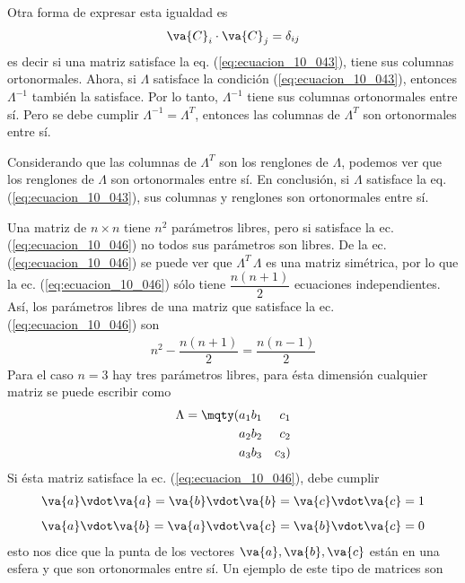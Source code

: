 Otra forma de expresar esta igualdad es
\begin{align}
\va{C}_{i} \cdot \va{C}_{j} = \delta_{ij}
\label{eq:ecuacion_10_047}
\end{align}
es decir si una matriz satisface la eq. (\ref{eq:ecuacion_10_043}), tiene sus columnas ortonormales.
Ahora, si $\Lambda$ satisface la condición (\ref{eq:ecuacion_10_043}), entonces $\Lambda^{-1}$ también la satisface. Por lo tanto, $\Lambda^{-1}$ tiene sus columnas ortonormales entre sí. Pero se debe cumplir $\Lambda^{-1} = \Lambda^{T}$, entonces las columnas de $\Lambda^{T}$ son ortonormales entre sí.
\par
Considerando que las columnas de $\Lambda^{T}$ son los renglones de $\Lambda$, podemos ver que los renglones de $\Lambda$ son ortonormales entre sí. En conclusión, si $\Lambda$ satisface la eq. (\ref{eq:ecuacion_10_043}), sus columnas y renglones son ortonormales entre sí.
\par
Una matriz de $n \times n$ tiene $n^{2}$ parámetros libres, pero si satisface la ec. (\ref{eq:ecuacion_10_046}) no todos sus parámetros son libres. De la ec. (\ref{eq:ecuacion_10_046}) se puede ver que $\Lambda^{T} \, \Lambda$ es una matriz simétrica, por lo que la ec. (\ref{eq:ecuacion_10_046}) sólo tiene $\dfrac{n (n+1)}{2}$ ecuaciones independientes. Así, los parámetros libres de una matriz que satisface la ec. (\ref{eq:ecuacion_10_046}) son
\begin{align*}
n^{2} - \dfrac{n (n+1)}{2} = \dfrac{n (n-1)}{2}
\end{align*}
Para el caso $n = 3$ hay tres parámetros libres, para ésta dimensión cualquier matriz se puede escribir como
\begin{align}
\Lambda = \mqty(a_{1} & b_{1} & c_{1} \\ a_{2} & b_{2} & c_{2} \\ a_{3} & b_{3} & c_{3})
\label{eq:ecuacion_10_048}
\end{align}
Si ésta matriz satisface la ec. (\ref{eq:ecuacion_10_046}), debe cumplir
\begin{align}
\begin{aligned}
\va{a} \vdot \va{a} = \va{b} \vdot \va{b} = \va{c} \vdot \va{c} =  1 \\[0.5em]
\va{a} \vdot \va{b} = \va{a} \vdot \va{c} = \va{b} \vdot \va{c} =  0
\end{aligned}
\label{eq:ecuacion_10_049}
\end{align}
esto nos dice que la punta de los vectores $\va{a}, \va{b},\va{c}$ están en una esfera y que son ortonormales entre sí. Un ejemplo de este tipo de matrices son
